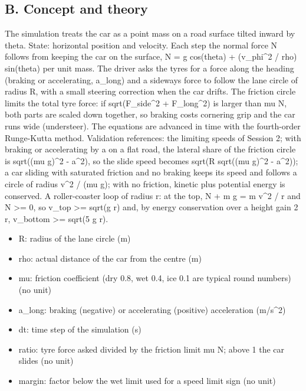 \documentclass[11pt,a4paper]{article}
\begin{document}
\subsection*{B. Concept and theory}
The simulation treats the car as a point mass on a road surface tilted inward by theta. State: horizontal position and velocity. Each step the normal force N follows from keeping the car on the surface, N = g cos(theta) + (v\_phi\textasciicircum{}2 / rho) sin(theta) per unit mass. The driver asks the tyres for a force along the heading (braking or accelerating, a\_long) and a sideways force to follow the lane circle of radius R, with a small steering correction when the car drifts. The friction circle limits the total tyre force: if sqrt(F\_side\textasciicircum{}2 + F\_long\textasciicircum{}2) is larger than mu N, both parts are scaled down together, so braking costs cornering grip and the car runs wide (understeer). The equations are advanced in time with the fourth-order Runge-Kutta method. Validation references: the limiting speeds of Session 2; with braking or accelerating by a on a flat road, the lateral share of the friction circle is sqrt((mu g)\textasciicircum{}2 - a\textasciicircum{}2), so the slide speed becomes sqrt(R sqrt((mu g)\textasciicircum{}2 - a\textasciicircum{}2)); a car sliding with saturated friction and no braking keeps its speed and follows a circle of radius v\textasciicircum{}2 / (mu g); with no friction, kinetic plus potential energy is conserved. A roller-coaster loop of radius r: at the top, N + m g = m v\textasciicircum{}2 / r and N \textgreater{}= 0, so v\_top \textgreater{}= sqrt(g r) and, by energy conservation over a height gain 2 r, v\_bottom \textgreater{}= sqrt(5 g r).

\begin{itemize}[nosep]
\item R: radius of the lane circle (m)
\item rho: actual distance of the car from the centre (m)
\item mu: friction coefficient (dry 0.8, wet 0.4, ice 0.1 are typical round numbers) (no unit)
\item a\_long: braking (negative) or accelerating (positive) acceleration (m/s\textasciicircum{}2)
\item dt: time step of the simulation (s)
\item ratio: tyre force asked divided by the friction limit mu N; above 1 the car slides (no unit)
\item margin: factor below the wet limit used for a speed limit sign (no unit)
\end{itemize}
\end{document}
